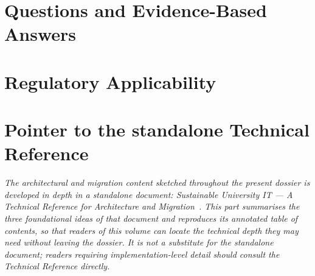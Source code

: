 \documentclass[11pt,a4paper,twoside]{book}
\newcommand{\genericroot}{../../..}
\newcommand{\policysrc}{\genericroot/suit-policy}%
\let\oldsection\section
\begin{document}
\part{Questions and Evidence-Based Answers}\label{part:argumentation}
\setcounter{section}{0}
\renewcommand{\theHsection}{arg.\arabic{section}}
\glsresetall


\part{Regulatory Applicability}\label{part:reg-applicability}
\setcounter{section}{0}
\renewcommand{\section}{\clearpage\oldsection}
\renewcommand{\theHsection}{reg.\arabic{section}}
\glsresetall


\part{Pointer to the standalone Technical Reference}\label{annex:tech-ref-pointer}
\setcounter{section}{0}
\renewcommand{\section}{\oldsection}
\glsresetall

\begin{tcolorbox}[colback=Slate!4!white,colframe=Slate!60!black,boxrule=0.6pt,
    sharp corners=south,left=8pt,right=8pt,top=6pt,bottom=6pt,
    title={\textbf{About this part}}]
\itshape\noindent
The architectural and migration content sketched throughout the present dossier
is developed in depth in a standalone document: \emph{Sustainable University IT
--- A Technical Reference for Architecture and Migration}~\cite{ng-tech-ref-2026}.
This part summarises the three foundational ideas of that document and reproduces
its annotated table of contents, so that readers of this volume can locate the
technical depth they may need without leaving the dossier. It is not a substitute
for the standalone document; readers requiring implementation-level detail should
consult the Technical Reference directly.
\end{tcolorbox}
\end{document}

